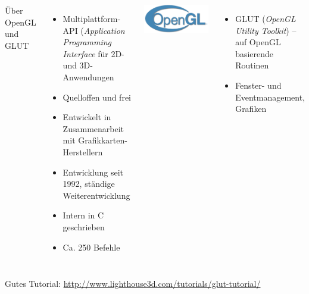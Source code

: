 
\begin{frame}[t,plain]
\titlepage
\end{frame}


\begin{frame}
%
\begin{columns}[T]
\begin{Large}
{Über OpenGL und GLUT}
\vspace{10pt}
\end{Large}
%
\begin{itemize}
\item Multiplattform-API (\emph{Application Programming Interface} für 2D- und 3D-Anwendungen
\item Quelloffen und frei
\item Entwickelt in Zusammenarbeit mit Grafikkarten-Herstellern
\item Entwicklung seit 1992, ständige Weiterentwicklung
\item Intern in C geschrieben
\item Ca. 250 Befehle
\end{itemize}
%
\vspace{15pt}
\href{https://www.opengl.org/}{\includegraphics[width=\linewidth]{./gfx/OpenGL-Logo}}
\begin{itemize}
\item GLUT (\emph{OpenGL Utility Toolkit}) -- auf OpenGL basierende Routinen
\item Fenster- und Eventmanagement, Grafiken
\end{itemize}
\end{columns}
%
\vspace{15pt}
{\scriptsize Gutes Tutorial: \url{http://www.lighthouse3d.com/tutorials/glut-tutorial/}}
%
\end{frame}

